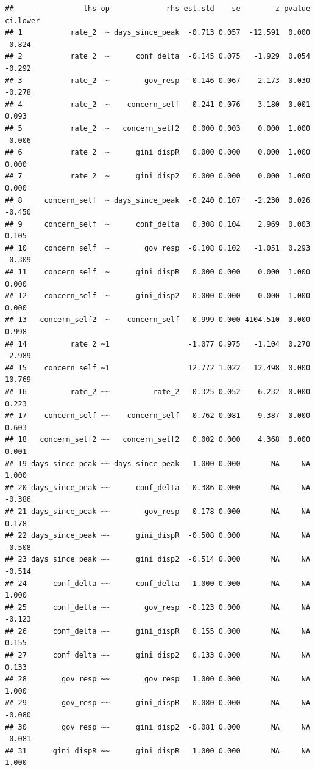 \documentclass[
]{article}
\begin{document}
\begin{verbatim}
##                lhs op             rhs est.std    se        z pvalue ci.lower
## 1           rate_2  ~ days_since_peak  -0.713 0.057  -12.591  0.000   -0.824
## 2           rate_2  ~      conf_delta  -0.145 0.075   -1.929  0.054   -0.292
## 3           rate_2  ~        gov_resp  -0.146 0.067   -2.173  0.030   -0.278
## 4           rate_2  ~    concern_self   0.241 0.076    3.180  0.001    0.093
## 5           rate_2  ~   concern_self2   0.000 0.003    0.000  1.000   -0.006
## 6           rate_2  ~      gini_dispR   0.000 0.000    0.000  1.000    0.000
## 7           rate_2  ~      gini_disp2   0.000 0.000    0.000  1.000    0.000
## 8     concern_self  ~ days_since_peak  -0.240 0.107   -2.230  0.026   -0.450
## 9     concern_self  ~      conf_delta   0.308 0.104    2.969  0.003    0.105
## 10    concern_self  ~        gov_resp  -0.108 0.102   -1.051  0.293   -0.309
## 11    concern_self  ~      gini_dispR   0.000 0.000    0.000  1.000    0.000
## 12    concern_self  ~      gini_disp2   0.000 0.000    0.000  1.000    0.000
## 13   concern_self2  ~    concern_self   0.999 0.000 4104.510  0.000    0.998
## 14          rate_2 ~1                  -1.077 0.975   -1.104  0.270   -2.989
## 15    concern_self ~1                  12.772 1.022   12.498  0.000   10.769
## 16          rate_2 ~~          rate_2   0.325 0.052    6.232  0.000    0.223
## 17    concern_self ~~    concern_self   0.762 0.081    9.387  0.000    0.603
## 18   concern_self2 ~~   concern_self2   0.002 0.000    4.368  0.000    0.001
## 19 days_since_peak ~~ days_since_peak   1.000 0.000       NA     NA    1.000
## 20 days_since_peak ~~      conf_delta  -0.386 0.000       NA     NA   -0.386
## 21 days_since_peak ~~        gov_resp   0.178 0.000       NA     NA    0.178
## 22 days_since_peak ~~      gini_dispR  -0.508 0.000       NA     NA   -0.508
## 23 days_since_peak ~~      gini_disp2  -0.514 0.000       NA     NA   -0.514
## 24      conf_delta ~~      conf_delta   1.000 0.000       NA     NA    1.000
## 25      conf_delta ~~        gov_resp  -0.123 0.000       NA     NA   -0.123
## 26      conf_delta ~~      gini_dispR   0.155 0.000       NA     NA    0.155
## 27      conf_delta ~~      gini_disp2   0.133 0.000       NA     NA    0.133
## 28        gov_resp ~~        gov_resp   1.000 0.000       NA     NA    1.000
## 29        gov_resp ~~      gini_dispR  -0.080 0.000       NA     NA   -0.080
## 30        gov_resp ~~      gini_disp2  -0.081 0.000       NA     NA   -0.081
## 31      gini_dispR ~~      gini_dispR   1.000 0.000       NA     NA    1.000

\end{verbatim}
\end{document}
